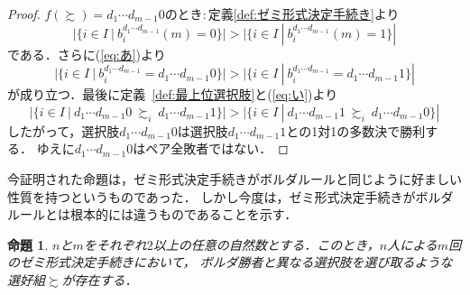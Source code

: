 \documentclass[dvipdfmx]{jsarticle}
\newtheorem{proposition}[definition]{命題}
\begin{document}
\begin{proof}
  \noindent$f(\succsim) = d_1\cdots d_{m-1}0$のとき$\colon$定義\ref{def:ゼミ形式決定手続き}より
  \[
    |\{ i \in I \ | \ b_{i}^{d_1\cdots d_{m-1}}(m)=0 \}| > |\{ i \in I \ | \ b_{i}^{d_1\cdots d_{m-1}}(m)=1 \}|
  \]
  である．さらに(\ref{eq:あ})より
  \[
    |\{ i \in I \ | \ b_{i}^{d_1\cdots d_{m-1}}=d_1\cdots d_{m-1}0 \}| >
    |\{ i \in I \ | \ b_{i}^{d_1\cdots d_{m-1}}=d_1\cdots d_{m-1}1 \}|
  \]
  が成り立つ．最後に定義~\ref{def:最上位選択肢}と(\ref{eq:い})より
  \[
    |\{ i \in I \ | \ d_1\cdots d_{m-1}0\ \succsim_i\ d_1\cdots d_{m-1}1 \}| >
    |\{ i \in I \ | \ d_1\cdots d_{m-1}1\ \succsim_i\ d_1\cdots d_{m-1}0 \}|
  \]
  したがって，選択肢$d_1\cdots d_{m-1}0$は選択肢$d_1\cdots d_{m-1}1$との1対1の多数決で勝利する．
  ゆえに$d_1\cdots d_{m-1}0$はペア全敗者ではない．
\end{proof}

今証明された命題は，ゼミ形式決定手続きがボルダルールと同じように好ましい性質を持つというものであった．
しかし今度は，ゼミ形式決定手続きがボルダルールとは根本的には違うものであることを示す．

\begin{proposition}\label{pro:ボルダルールとは違う}
  $n$と$m$をそれぞれ$2$以上の任意の自然数とする．このとき，$n$人による$m$回のゼミ形式決定手続きにおいて，
  ボルダ勝者と異なる選択肢を選び取るような選好組$\succsim$が存在する．
\end{proposition}
\end{document}
